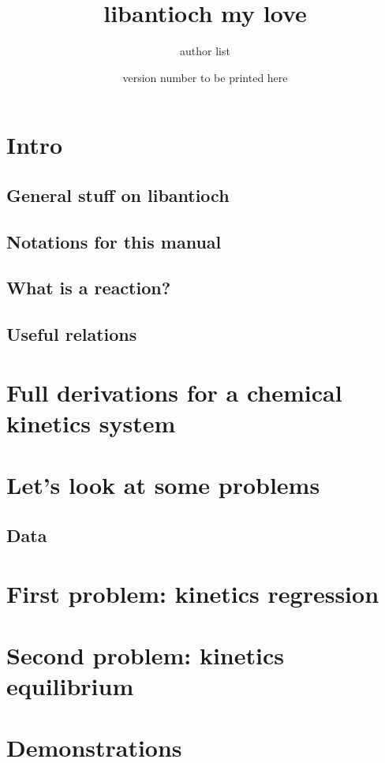 \documentclass{article}
\begin{document}
\title{libantioch my love}
\date{version number to be printed here}
\author{author list}

\maketitle
\tableofcontents

\section{Intro}

\subsection{General stuff on libantioch}


\subsection{Notations for this manual}


\subsection{What is a reaction?}
\label{kinetics_gen}


\subsection{Useful relations}
\label{relations}


\section{Full derivations for a chemical kinetics system}
\label{derivations}


\section{Let's look at some problems}
\subsection{Data}


\section{First problem: kinetics regression}


\section{Second problem: kinetics equilibrium}


\appendix
\section{Demonstrations}
\label{demo}

\end{document}
